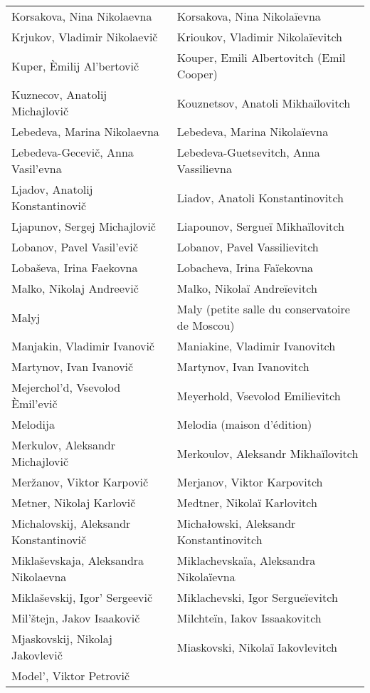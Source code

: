 {\begin{longtable}[c]{ll}
 Korsakova, Nina Nikolaevna
 & Korsakova, Nina Nikolaïevna
 \\
 Krjukov, Vladimir Nikolaevič
 & Krioukov, Vladimir Nikolaïevitch
 \\
 Kuper, Èmilij Al'bertovič
 & Kouper, Emili Albertovitch (Emil Cooper)
 \\
 Kuznecov, Anatolij Michajlovič
 & Kouznetsov, Anatoli Mikhaïlovitch
 \\
 Lebedeva, Marina Nikolaevna
 & Lebedeva, Marina Nikolaïevna
 \\
 Lebedeva-Gecevič, Anna Vasil'evna
 & Lebedeva-Guetsevitch, Anna Vassilievna
 \\
 Ljadov, Anatolij Konstantinovič
 & Liadov, Anatoli Konstantinovitch
 \\
 Ljapunov, Sergej Michajlovič
 & Liapounov, Sergueï Mikhaïlovitch
 \\
 Lobanov, Pavel Vasil'evič
 & Lobanov, Pavel Vassilievitch
 \\
 Lobaševa, Irina Faekovna
 & Lobacheva, Irina Faïekovna
 \\
 Malko, Nikolaj Andreevič
 & Malko, Nikolaï Andreïevitch
 \\
 Malyj
 & Maly (petite salle du conservatoire de Moscou)
 \\
 Manjakin, Vladimir Ivanovič
 & Maniakine, Vladimir Ivanovitch
 \\
 Martynov, Ivan Ivanovič
 & Martynov, Ivan Ivanovitch
 \\
 Mejerchol'd, Vsevolod Èmil'evič
 & Meyerhold, Vsevolod Emilievitch
 \\
 Melodija
 & Melodia (maison d'édition)
 \\
 Merkulov, Aleksandr Michajlovič
 & Merkoulov, Aleksandr Mikhaïlovitch
 \\
 Meržanov, Viktor Karpovič
 & Merjanov, Viktor Karpovitch
 \\
 Metner, Nikolaj Karlovič
 & Medtner, Nikolaï Karlovitch
 \\
 Michalovskij, Aleksandr Konstantinovič
 & Michałowski, Aleksandr Konstantinovitch
 \\
 Miklaševskaja, Aleksandra Nikolaevna
 & Miklachevskaïa, Aleksandra Nikolaïevna
 \\
 Miklaševskij, Igor' Sergeevič
 & Miklachevski, Igor Sergueïevitch
 \\
 Mil'štejn, Jakov Isaakovič
 & Milchteïn, Iakov Issaakovitch
 \\
 Mjaskovskij, Nikolaj Jakovlevič
 & Miaskovski, Nikolaï Iakovlevitch
 \\
 Model', Viktor Petrovič

\end{longtable}}
